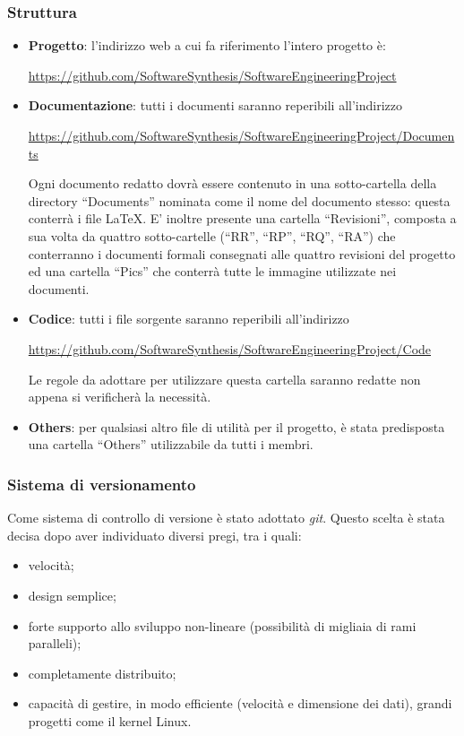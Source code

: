 \subsubsection{Struttura}
\begin{itemize}
\item \textbf{Progetto}: l'indirizzo web a cui fa riferimento l'intero progetto è: 
\begin{center}
\url{https://github.com/SoftwareSynthesis/SoftwareEngineeringProject}
\end{center} 
\item \textbf{Documentazione}: tutti i documenti saranno reperibili all'indirizzo
\begin{center}
\url{https://github.com/SoftwareSynthesis/SoftwareEngineeringProject/Documents}
\end{center}
Ogni documento redatto dovrà essere contenuto in una sotto-cartella della directory ``Documents'' nominata come il nome del documento stesso: questa conterrà i file \LaTeX. E' inoltre presente una cartella ``Revisioni'', composta a sua volta da quattro sotto-cartelle (``RR'', ``RP'', ``RQ'', ``RA'') che conterranno i documenti formali consegnati alle quattro revisioni del progetto ed una cartella ``Pics'' che conterrà tutte le immagine utilizzate nei documenti.
\item \textbf{Codice}: tutti i file sorgente saranno reperibili all'indirizzo
\begin{center}
\url{https://github.com/SoftwareSynthesis/SoftwareEngineeringProject/Code}
\end{center}
Le regole da adottare per utilizzare questa cartella saranno redatte non appena si verificherà la necessità.
\item \textbf{Others}: per qualsiasi altro file di utilità per il progetto, è stata predisposta una cartella ``Others'' utilizzabile da tutti i membri.
\end{itemize}

\subsubsection{Sistema di versionamento}
Come sistema di controllo di versione è stato adottato \textit{git}. Questo scelta è stata decisa dopo aver individuato diversi pregi, tra i quali:
\begin{itemize}
\item velocità;
\item design semplice;
\item forte supporto allo sviluppo non-lineare (possibilità di migliaia di rami paralleli);
\item completamente distribuito;
\item capacità di gestire, in modo efficiente (velocità e dimensione dei dati), grandi progetti come il kernel Linux.
\end{itemize}

